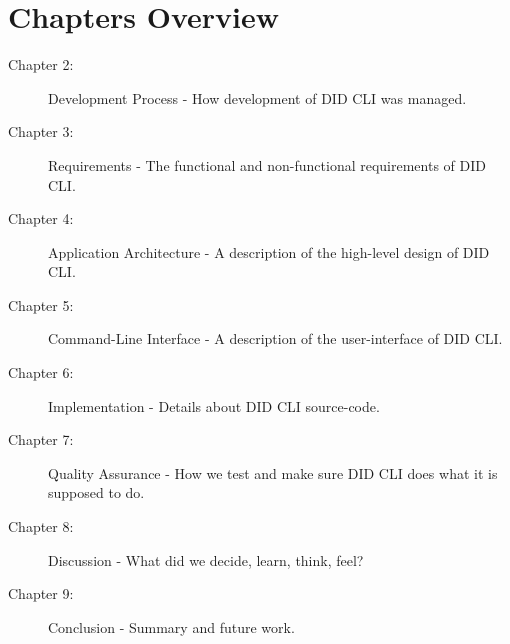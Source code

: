 \newpage

\section{Chapters Overview}

\begin{description}
    \item[Chapter 2:] Development Process - How development of DID CLI was managed.
    \item[Chapter 3:] Requirements - The functional and non-functional requirements of DID CLI.
    \item[Chapter 4:] Application Architecture - A description of the high-level design of DID CLI.
    \item[Chapter 5:] Command-Line Interface - A description of the user-interface of DID CLI.
    \item[Chapter 6:] Implementation - Details about DID CLI source-code.
    \item[Chapter 7:] Quality Assurance - How we test and make sure DID CLI does what it is supposed to do. 
    \item[Chapter 8:] Discussion - What did we decide, learn, think, feel?
    \item[Chapter 9:] Conclusion - Summary and future work.
\end{description}
